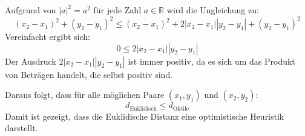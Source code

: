 Aufgrund von $|a|^2 = a^2$ für jede Zahl $a\in\mathbb{R}$ wird die Ungleichung zu:
\begin{equation*}
(x_2 - x_1)^2 + (y_2 - y_1)^2 \leq (x_2 - x_1)^2 + 2|x_2 - x_1||y_2 - y_1| + (y_2 - y_1)^2
\end{equation*}
Vereinfacht ergibt sich:
\begin{equation*}
    0 \leq 2|x_2 - x_1||y_2 - y_1|
\end{equation*}
Der Ausdruck $2|x_2 - x_1||y_2 - y_1|$ ist immer positiv, da es sich um das Produkt von Beträgen handelt, die selbst positiv sind.

Daraus folgt, dass für alle möglichen Paare $(x_1, y_1)$ und $(x_2, y_2)$:
\begin{equation*}
    d_\text{Euklidisch} \leq d_\text{Oktile}
\end{equation*}
Damit ist gezeigt, dass die Euklidische Distanz eine optimistische Heuristik darstellt.